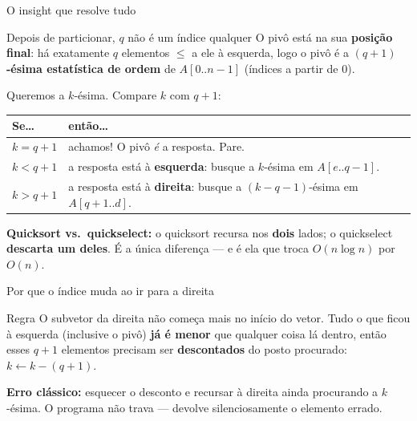 \documentclass[aspectratio=169]{beamer}
\begin{document}
\begin{frame}{O insight que resolve tudo}
  \begin{block}{Depois de particionar, $q$ não é um índice qualquer}
    O pivô está na sua \textbf{posição final}: há exatamente $q$ elementos
    $\le$ a ele à esquerda, logo o pivô é a \textbf{$(q+1)$-ésima estatística
    de ordem} de $A[0..n-1]$ (índices a partir de $0$).
  \end{block}

  Queremos a $k$-ésima. Compare $k$ com $q+1$:

  \begin{center}
  \small
  \begin{tabular}{ll}
    \toprule
    \textbf{Se\dots} & \textbf{então\dots}\\
    \midrule
    $k = q+1$ & achamos! O pivô \emph{é} a resposta. Pare.\\
    $k < q+1$ & a resposta está à \textbf{esquerda}: busque a $k$-ésima em $A[e..q-1]$.\\
    $k > q+1$ & a resposta está à \textbf{direita}: busque a $(k-q-1)$-ésima em $A[q+1..d]$.\\
    \bottomrule
  \end{tabular}
  \end{center}

  \textbf{Quicksort vs.\ quickselect:} o quicksort recursa nos \textbf{dois}
  lados; o quickselect \textbf{descarta um deles}. É a única diferença --- e é
  ela que troca $O(n\log n)$ por $O(n)$.
\end{frame}

\begin{frame}{Por que o índice muda ao ir para a direita}
  \begin{center}
  \end{center}

  \begin{block}{Regra}
    O subvetor da direita não começa mais no início do vetor. Tudo o que ficou
    à esquerda (inclusive o pivô) \textbf{já é menor} que qualquer coisa lá
    dentro, então esses $q+1$ elementos precisam ser \textbf{descontados} do
    posto procurado: $k \leftarrow k - (q+1)$.
  \end{block}

  \textbf{Erro clássico:} esquecer o desconto e recursar à direita ainda
  procurando a $k$-ésima. O programa não trava --- devolve silenciosamente o
  elemento errado.
\end{frame}
\end{document}
